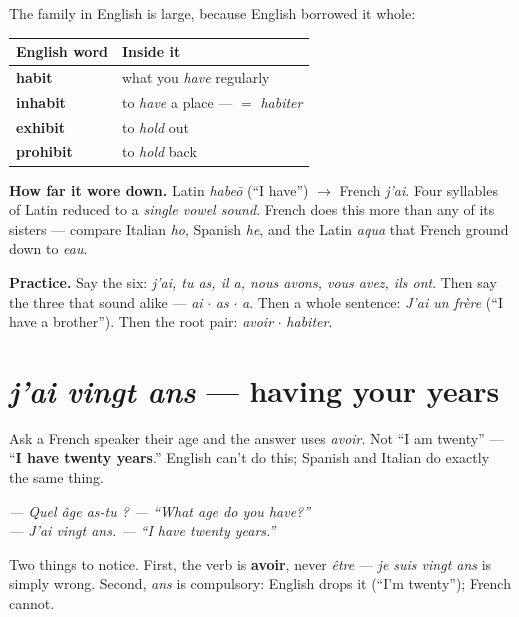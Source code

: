The family in English is large, because English borrowed it whole:

\begin{center}
\begin{tabular}{@{}ll@{}}
\toprule
English word & Inside it \\
\midrule
\textbf{habit} & what you \emph{have} regularly \\
\textbf{inhabit} & to \emph{have} a place --- $=$ \emph{habiter} \\
\textbf{exhibit} & to \emph{hold} out \\
\textbf{prohibit} & to \emph{hold} back \\
\bottomrule
\end{tabular}
\end{center}

\begin{grammarlens}
\textbf{How far it wore down.} Latin \emph{habe\=o} (``I have'') $\to$ French
\emph{j'ai}. Four syllables of Latin reduced to a \emph{single vowel sound}.
French does this more than any of its sisters --- compare Italian \emph{ho},
Spanish \emph{he}, and the Latin \emph{aqua} that French ground down to
\emph{eau}.
\end{grammarlens}

\begin{sounds}
\textbf{Practice.} Say the six: \emph{j'ai, tu as, il a, nous avons, vous avez,
ils ont}. Then say the three that sound alike --- \emph{ai} $\cdot$ \emph{as}
$\cdot$ \emph{a}. Then a whole sentence: \emph{J'ai un fr\`{e}re} (``I have a
brother''). Then the root pair: \emph{avoir} $\cdot$ \emph{habiter}.
\end{sounds}

\section{\emph{j'ai vingt ans} --- having your years}
\label{lesson:age}

Ask a French speaker their age and the answer uses \emph{avoir}. Not ``I am
twenty'' --- ``\textbf{I have twenty years}.'' English can't do this; Spanish
and Italian do exactly the same thing.

\begin{center}\itshape
--- Quel \^{a}ge as-tu ? --- ``What age do you \emph{have}?''\\
--- J'ai vingt ans. --- ``I \emph{have} twenty years.''
\end{center}

\begin{grammarlens}
Two things to notice. First, the verb is \textbf{avoir}, never \emph{\^{e}tre}
--- \emph{je suis vingt ans} is simply wrong. Second, \emph{ans} is compulsory:
English drops it (``I'm twenty''); French cannot.
\end{grammarlens}

